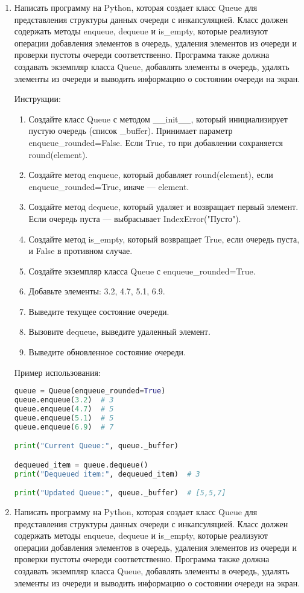 \begin{enumerate}
\item Написать программу на Python, которая создает класс Queue для представления структуры данных очереди с инкапсуляцией. Класс должен содержать методы enqueue, dequeue и is\_empty, которые реализуют операции добавления элементов в очередь, удаления элементов из очереди и проверки пустоты очереди соответственно. Программа также должна создавать экземпляр класса Queue, добавлять элементы в очередь, удалять элементы из очереди и выводить информацию о состоянии очереди на экран.

Инструкции:
\begin{enumerate}
    \item Создайте класс Queue с методом \_\_init\_\_, который инициализирует пустую очередь (список \_buffer). Принимает параметр enqueue\_rounded=False. Если True, то при добавлении сохраняется round(element).
    \item Создайте метод enqueue, который добавляет round(element), если enqueue\_rounded=True, иначе — element.
    \item Создайте метод dequeue, который удаляет и возвращает первый элемент. Если очередь пуста — выбрасывает IndexError("Пусто").
    \item Создайте метод is\_empty, который возвращает True, если очередь пуста, и False в противном случае.
    \item Создайте экземпляр класса Queue с enqueue\_rounded=True.
    \item Добавьте элементы: 3.2, 4.7, 5.1, 6.9.
    \item Выведите текущее состояние очереди.
    \item Вызовите dequeue, выведите удаленный элемент.
    \item Выведите обновленное состояние очереди.
\end{enumerate}

Пример использования:
\begin{lstlisting}[language=Python]
queue = Queue(enqueue_rounded=True)
queue.enqueue(3.2)  # 3
queue.enqueue(4.7)  # 5
queue.enqueue(5.1)  # 5
queue.enqueue(6.9)  # 7

print("Current Queue:", queue._buffer)

dequeued_item = queue.dequeue()
print("Dequeued item:", dequeued_item)  # 3

print("Updated Queue:", queue._buffer)  # [5,5,7]
\end{lstlisting}

\item Написать программу на Python, которая создает класс Queue для представления структуры данных очереди с инкапсуляцией. Класс должен содержать методы enqueue, dequeue и is\_empty, которые реализуют операции добавления элементов в очередь, удаления элементов из очереди и проверки пустоты очереди соответственно. Программа также должна создавать экземпляр класса Queue, добавлять элементы в очередь, удалять элементы из очереди и выводить информацию о состоянии очереди на экран.


\end{enumerate}
